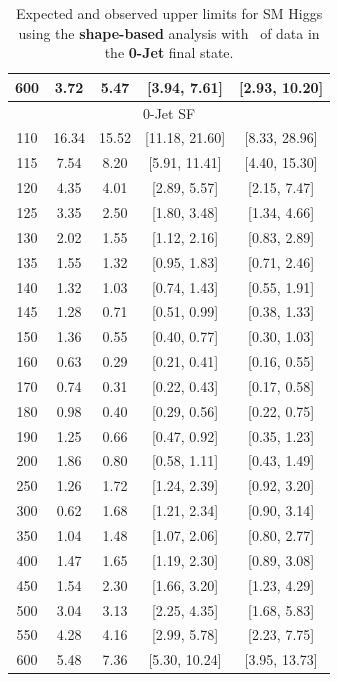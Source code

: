 \begin{table}[hbp!]
\begin{center}
\begin{tabular}{c c c c c}
600 & 3.72 & 5.47 & [3.94, 7.61] & [2.93, 10.20] \\
\hline
\multicolumn{5}{c}{0-Jet SF} \\
\hline
110 & 16.34 & 15.52 & [11.18, 21.60] & [8.33, 28.96] \\
115 & 7.54 & 8.20 & [5.91, 11.41] & [4.40, 15.30] \\
120 & 4.35 & 4.01 & [2.89, 5.57] & [2.15, 7.47] \\
125 & 3.35 & 2.50 & [1.80, 3.48] & [1.34, 4.66] \\
130 & 2.02 & 1.55 & [1.12, 2.16] & [0.83, 2.89] \\
135 & 1.55 & 1.32 & [0.95, 1.83] & [0.71, 2.46] \\
140 & 1.32 & 1.03 & [0.74, 1.43] & [0.55, 1.91] \\
145 & 1.28 & 0.71 & [0.51, 0.99] & [0.38, 1.33] \\
150 & 1.36 & 0.55 & [0.40, 0.77] & [0.30, 1.03] \\
160 & 0.63 & 0.29 & [0.21, 0.41] & [0.16, 0.55] \\
170 & 0.74 & 0.31 & [0.22, 0.43] & [0.17, 0.58] \\
180 & 0.98 & 0.40 & [0.29, 0.56] & [0.22, 0.75] \\
190 & 1.25 & 0.66 & [0.47, 0.92] & [0.35, 1.23] \\
200 & 1.86 & 0.80 & [0.58, 1.11] & [0.43, 1.49] \\
250 & 1.26 & 1.72 & [1.24, 2.39] & [0.92, 3.20] \\
300 & 0.62 & 1.68 & [1.21, 2.34] & [0.90, 3.14] \\
350 & 1.04 & 1.48 & [1.07, 2.06] & [0.80, 2.77] \\
400 & 1.47 & 1.65 & [1.19, 2.30] & [0.89, 3.08] \\
450 & 1.54 & 2.30 & [1.66, 3.20] & [1.23, 4.29] \\
500 & 3.04 & 3.13 & [2.25, 4.35] & [1.68, 5.83] \\
550 & 4.28 & 4.16 & [2.99, 5.78] & [2.23, 7.75] \\
600 & 5.48 & 7.36 & [5.30, 10.24] & [3.95, 13.73] \\

\hline
\end{tabular}
\caption{Expected and observed upper limits for SM Higgs using the
  {\bf shape-based} analysis with \intlumiEightTeV\ of data in the {\bf 0-Jet} final state.}
\label{tab:shapebase_uls_0j}
\end{center}
\end{table}

